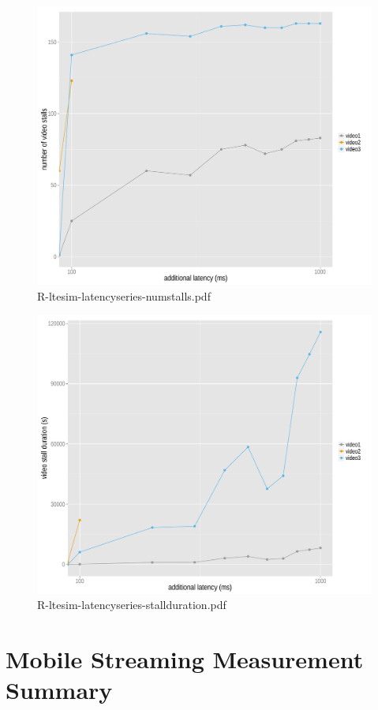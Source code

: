 \begin{figure}[htb]
\centering
\includegraphics[width=1.0\textwidth]{images/R-ltesim-latencyseries-numstalls.pdf}
\caption{R-ltesim-latencyseries-numstalls.pdf}
\label{c5:fig:ltesim-latencyseries-numstalls}
\end{figure}

\begin{figure}[htb]
\centering
\includegraphics[width=1.0\textwidth]{images/R-ltesim-latencyseries-stallduration.pdf}
\caption{R-ltesim-latencyseries-stallduration.pdf}
\label{c5:fig:ltesim-latencyseries-stallduration}
\end{figure}










\section{Mobile Streaming Measurement Summary}